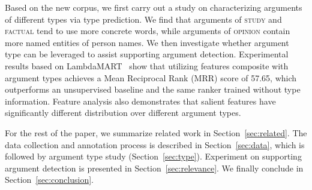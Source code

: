 Based on the new corpus, we first carry out a study on characterizing arguments of different types via type prediction. We find that arguments of \textsc{study} and \textsc{factual} tend to use more concrete words, while arguments of \textsc{opinion} contain more named entities of person names. 
%
We then investigate whether argument type can be leveraged to assist supporting argument detection. Experimental results based on LambdaMART~\cite{burges2010ranknet} show that utilizing features composite with argument types achieves a Mean Reciprocal Rank (MRR) score of 57.65, which outperforms an unsupervised baseline and the same ranker trained without type information. Feature analysis also demonstrates that salient features have significantly different distribution over different argument types. 
%


For the rest of the paper, we summarize related work in Section~\ref{sec:related}. The data collection and annotation process is described in Section~\ref{sec:data}, which is followed by argument type study (Section~\ref{sec:type}). Experiment on supporting argument detection is presented in Section~\ref{sec:relevance}. We finally conclude in Section~\ref{sec:conclusion}.




